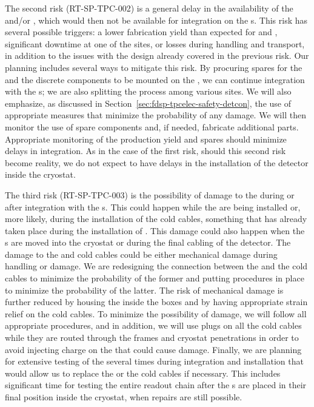 The second risk (RT-SP-TPC-002) is a general delay in the availability of the 
and/or , which would then not be available for integration
on the s. This risk has several possible triggers: a lower fabrication yield 
than expected for  and ,
significant downtime at one of the  sites, or losses during 
handling and transport, in addition to the issues with the design already 
covered in the previous risk. Our planning includes several ways to mitigate this risk. By
procuring spares for the  and the discrete components to be mounted on the
, we can continue integration with the s;
we are also splitting the  process among various sites. We will also emphasize,
as discussed in Section~\ref{sec:fdsp-tpcelec-safety-detcon}, the use of appropriate
measures that minimize the probability of any  damage. We will then monitor the use
of spare components and, if needed, fabricate additional parts. Appropriate
monitoring of the production yield and spares should minimize
delays in  integration. As in the case of the first risk, should this
second risk become reality, we do not expect to have delays in the installation of the 
detector inside the cryostat. 
 
The third risk (RT-SP-TPC-003) is the possibility of damage to the 
 during or after integration with the s. This could
happen while the  are being installed or, more likely, during the
installation of the cold cables, something that has already taken place during
the installation of . This damage could also happen when the s are
moved into the cryostat or during the final cabling of the detector. The damage
to the  and cold cables could be either mechanical damage during 
handling or  damage. We are redesigning the connection between the 
and the cold cables to minimize the probability of the former and putting procedures in place
to minimize the probability of the latter. The risk of mechanical damage
is further reduced by housing the  inside the  boxes and by having 
appropriate strain relief on the cold cables. To minimize the possibility of
 damage, we will follow all appropriate procedures, and in addition,
we will use plugs on all the cold cables while they are routed through the
 frames and cryostat penetrations in order to avoid injecting charge on
the  that could cause  damage. Finally, we are planning for
extensive testing of the  several times during integration
and installation that would allow us to replace the 
or the cold cables if necessary. This includes significant time for testing the entire readout 
chain after the s are placed in their final position inside the cryostat,
when repairs are still possible.


